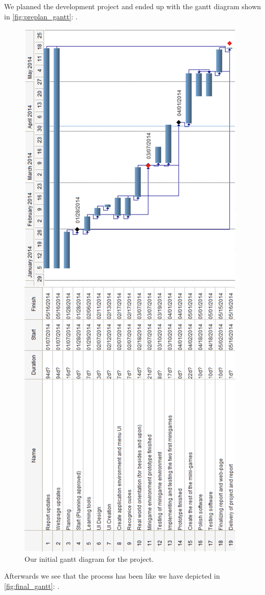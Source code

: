 We planned the development project and ended up with the gantt diagram shown in \autoref{fig:preplan_gantt}: .

\begin{figure}[ht]
	\capstart
	\centering
	\includegraphics[height=\textwidth, angle=270]{preplan_gantt_diagram}
	\caption[Preplan Gantt diagram]{Our initial gantt diagram for the project.}
	\label{fig:preplan_gantt}
\end{figure}


Afterwards we see that the process has been like we have depicted in \autoref{fig:final_gantt}: .

